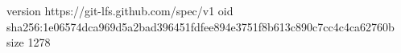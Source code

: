 version https://git-lfs.github.com/spec/v1
oid sha256:1e06574dca969d5a2bad396451fdfee894e3751f8b613c890c7cc4c4ca62760b
size 1278
